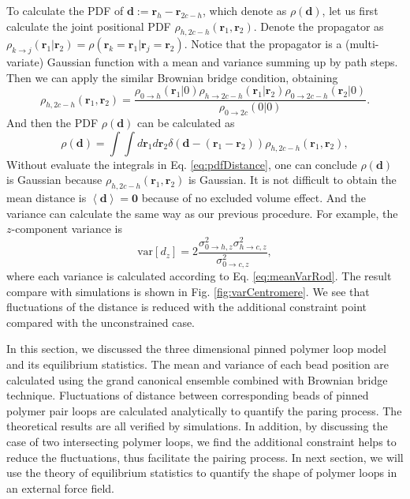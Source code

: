 To calculate the PDF of $\mathbf{d} := \mathbf{r}_h - \mathbf{r}_{2c-h}$, which denote as $\rho(\mathbf{d})$, let us first calculate the joint positional PDF $\rho_{h, 2c-h}(\mathbf{r}_1, \mathbf{r}_2)$. Denote the propagator as $\rho_{k\rightarrow j}(\mathbf{r}_1 | \mathbf{r}_2) = \rho(\mathbf{r}_k = \mathbf{r}_1 | \mathbf{r}_j = \mathbf{r}_2)$. Notice that the propagator is a (multi-variate) Gaussian function with a mean and variance summing up by path steps. Then we can apply the similar Brownian bridge condition, obtaining
\begin{equation}
    \label{eq:jointPdfDistance}
    \rho_{h,2c-h}(\mathbf{r}_1, \mathbf{r}_2) = \frac{\rho_{0\rightarrow h}(\mathbf{r}_1|0)\rho_{h\rightarrow 2c-h}(\mathbf{r}_1|\mathbf{r}_2)\rho_{0\rightarrow 2c-h}(\mathbf{r}_2|0)}{\rho_{0\rightarrow 2c}(0|0)}.
\end{equation}
And then the PDF $\rho(\mathbf{d})$ can be calculated as 
\begin{equation}
    \label{eq:pdfDistance}
    \rho(\mathbf{d}) = \int\int d\mathbf{r}_1 d\mathbf{r}_2 \delta(\mathbf{d} - (\mathbf{r}_1 - \mathbf{r}_2))\rho_{h, 2c-h}(\mathbf{r}_1, \mathbf{r}_2),
\end{equation}
Without evaluate the integrals in Eq. \eqref{eq:pdfDistance}, one can conclude $\rho(\mathbf{d})$ is Gaussian because $\rho_{h,2c-h}(\mathbf{r}_1, \mathbf{r}_2)$ is Gaussian. It is not difficult to obtain the mean distance is $\left<\mathbf{d}\right>=\mathbf{0}$ because of no excluded volume effect. And the variance can calculate the same way as our previous procedure. For example, the $z$-component variance is
\begin{equation}
    \label{eq:zvarDistance}
    \text{var}\left[ d_z \right] = 2 \frac{\sigma_{0\rightarrow h,z}^2\sigma_{h\rightarrow c,z}^2}{\sigma_{0\rightarrow c,z}^2}, 
\end{equation}
where each variance is calculated according to Eq. \eqref{eq:meanVarRod}. The result compare with simulations is shown in Fig. \ref{fig:varCentromere}. We see that fluctuations of the distance is reduced with the additional constraint point compared with the unconstrained case. 

In this section, we discussed the three dimensional pinned polymer loop model and its equilibrium statistics. The mean and variance of each bead position are calculated using the grand canonical ensemble combined with Brownian bridge technique. 
Fluctuations of distance between corresponding beads of pinned polymer pair loops are calculated analytically to quantify the paring process. The theoretical results are all verified by simulations. In addition, by discussing the case of two intersecting polymer loops, we find the additional constraint helps to reduce the fluctuations, thus facilitate the pairing process. 
In next section, we will use the theory of equilibrium statistics to quantify the shape of polymer loops in an external force field.


